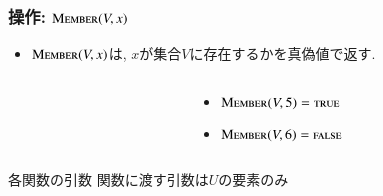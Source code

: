 \documentclass[main]{subfiles}
\begin{document}
\begin{frame}\frametitle{操作: $\mathrm{\text{M\textsc{ember}}}(V,x)$}
\begin{itemize}
\item $\mathrm{\text{M\textsc{ember}}}(V,x)$は, $x$が集合$V$に存在するかを真偽値で返す.\\
\end{itemize}
\begin{columns}[c]
	\begin{column}{0.5\linewidth}
		
	\end{column}
	\begin{column}{0.49\linewidth}
		\begin{itemize}
			\item $\mathrm{\text{M\textsc{ember}}}(V,5) = \text{\textsc{true}}$\\
			\item $\mathrm{\text{M\textsc{ember}}}(V,6) = \text{\textsc{false}}$\\
		\end{itemize}
	\end{column}
\end{columns}
\begin{alertblock}{各関数の引数}
関数に渡す引数は$U$の要素のみ
\end{alertblock}
\end{frame}
\end{document}
